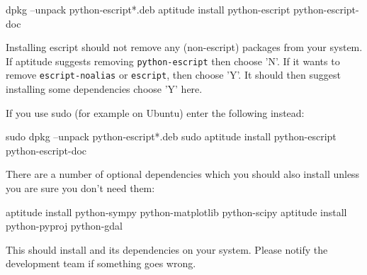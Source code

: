 \begin{shellCode}
dpkg --unpack python-escript*.deb
aptitude install python-escript python-escript-doc
\end{shellCode}

Installing escript should not remove any (non-escript) packages from your system.
If aptitude suggests removing \texttt{python-escript} then choose 'N'.
If it wants to remove \texttt{escript-noalias} or \texttt{escript}, then choose 'Y'.
It should then suggest installing some dependencies choose 'Y' here.

If you use sudo (for example on Ubuntu) enter the following instead:
\begin{shellCode}
sudo dpkg --unpack python-escript*.deb
sudo aptitude install python-escript python-escript-doc
\end{shellCode}

There are a number of optional dependencies which you should also install unless you are sure you don't need them:
\begin{shellCode}
aptitude install python-sympy python-matplotlib python-scipy 
aptitude install python-pyproj python-gdal
\end{shellCode}



This should install \esfinley and its dependencies on your system.
Please notify the development team if something goes wrong.

